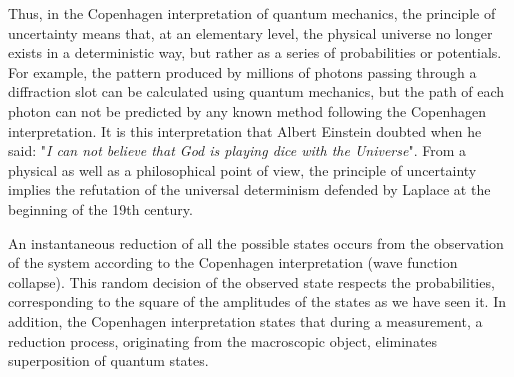 	Thus, in the Copenhagen interpretation of quantum mechanics, the principle of uncertainty means that, at an elementary level, the physical universe no longer exists in a deterministic way, but rather as a series of probabilities or potentials. For example, the pattern produced by millions of photons passing through a diffraction slot can be calculated using quantum mechanics, but the path of each photon can not be predicted by any known method following the Copenhagen interpretation. It is this interpretation that Albert Einstein doubted when he said: "\textit{I can not believe that God is playing dice with the Universe}". From a physical as well as a philosophical point of view, the principle of uncertainty implies the refutation of the universal determinism defended by Laplace at the beginning of the 19th century.
	
	An instantaneous reduction of all the possible states occurs from the observation of the system according to the Copenhagen  interpretation (wave function collapse). This random decision of the observed state respects the probabilities, corresponding to the square of the amplitudes of the states as we have seen it. In addition, the Copenhagen interpretation states that during a measurement, a reduction process, originating from the macroscopic object, eliminates superposition of quantum states.
	

